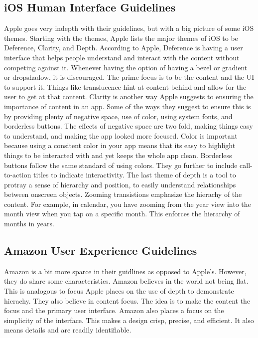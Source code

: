 \documentclass[journal,letterpaper]{article}
\begin{document}
    \subsection{iOS Human Interface Guidelines}
    Apple goes very indepth with their guidelines, but with a big picture of some iOS themes. Starting with the themes, Apple lists the major themes of iOS to be Deference, Clarity, and Depth. According to Apple, Deference is having a user interface that helps people understand and interact with the content without competing against it. Whenever having the option of having a bezel or gradient or dropshadow, it is discouraged. The prime focus is to be the content and the UI to support it. Things like translucence hint at content behind and allow for the user to get at that content. Clarity is another way Apple suggests to ensuring the importance of content in an app. Some of the ways they suggest to ensure this is by providing plenty of negative space, use of color, using system fonts, and borderless buttons. The effects of negative space are two fold, making things easy to understand, and making the app looked more focused. Color is important because using a consitent color in your app means that its easy to highlight things to be interacted with and yet keeps the whole app clean. Borderless buttons follow the same standard of using colors. They go further to include call-to-action titles to indicate interactivity. The last theme of depth is a tool to protray a sense of hierarchy and position, to easily understand relationships between onscreen objects. Zooming transistions emphasize the hierachy of the content. For example, in calendar, you have zooming from the year view into the month view when you tap on a specific month. This enforces the hierarchy of months in years. 

    \subsection{Amazon User Experience Guidelines}
    Amazon is a bit more sparce in their guidlines as opposed to Apple's. However, they do share some characteristics. Amazon believes in the world not being flat. This is analogous to focus Apple places on the use of depth to demonstrate hierachy. They also believe in content focus. The idea is to make the content the focus and the primary user interface. Amazon also places a focus on the simplicity of the interface. This makes a design crisp, precise, and efficient. It also means details and are readily identifiable. 

    
\end{document}
